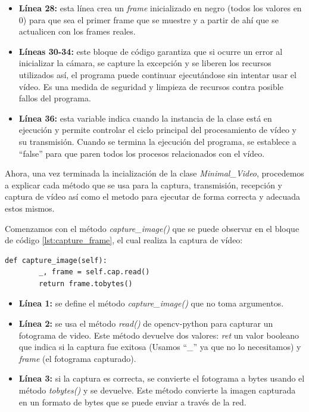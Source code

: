 \begin{itemize}
    \item \textbf{Línea 28:} esta línea crea un \textit{frame} inicializado en negro (todos los valores en 0) para que sea el primer frame que se muestre y a partir de ahí que se actualicen con los frames reales.
    \item \textbf{Líneas 30-34:} este bloque de código garantiza que si ocurre un error al inicializar la cámara, se capture la excepción y se liberen los recursos utilizados así, el programa puede continuar ejecutándose sin intentar usar el vídeo. Es una medida de seguridad y limpieza de recursos contra posible fallos del programa.
    \item \textbf{Línea 36:} esta variable indica cuando la instancia de la clase está en ejecución y permite controlar el ciclo principal del procesamiento de vídeo y su transmisión. Cuando se termina la ejecución del programa, se establece a ``false'' para que paren todos los procesos relacionados con el vídeo.
\end{itemize}

Ahora, una vez terminada la incialización de la clase \textit{Minimal\_Video}, procedemos a explicar cada método que se usa para la captura, transmisión, recepción y captura de vídeo así como el metodo para ejecutar de forma correcta y adecuada estos mismos.
\vspace{\baselineskip}

Comenzamos con el método \textit{capture\_image()} que se puede observar en el bloque de código \ref{lst:capture_frame}, el cual realiza la captura de vídeo:
\begin{lstlisting}[style=pythonstyle, caption={Método capture\_frame() de \textit{Minimal\_Video}}, label={lst:capture_frame}]
def capture_image(self):
        _, frame = self.cap.read()
        return frame.tobytes()
\end{lstlisting}

\begin{itemize}
    \item \textbf{Línea 1:} se define el método \textit{capture\_image()} que no toma argumentos.
    \item \textbf{Línea 2:} se usa el método \textit{read()} de opencv-python para capturar un fotograma de video. Este método devuelve dos valores: \textit{ret} un valor booleano que indica si la captura fue exitosa (Usamos ``\_'' ya que no lo necesitamos) y \textit{frame} (el fotograma capturado).
    \item \textbf{Línea 3:} si la captura es correcta, se convierte el fotograma a bytes usando el método \textit{tobytes()} y se devuelve. Este método convierte la imagen capturada en un formato de bytes que se puede enviar a través de la red.
\end{itemize}
\vspace{\baselineskip}

